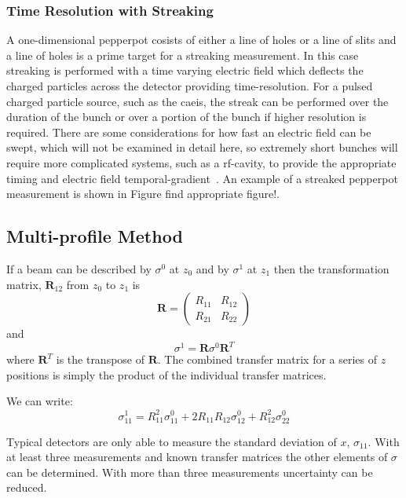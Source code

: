 \subsubsection{Time Resolution with Streaking}
A one-dimensional pepperpot cosists of either a line of holes or a line of slits and a line of holes is a prime target for a streaking measurement.
In this case streaking is performed with a time varying electric field which deflects the charged particles across the detector providing time-resolution.
For a pulsed charged particle source, such as the \gls{caeis}, the streak can be performed over the duration of the bunch or over a portion of the bunch if higher resolution is required.
There are some considerations for how fast an electric field can be swept, which will not be examined in detail here, so extremely short bunches will require more complicated systems, such as a rf-cavity, to provide the appropriate timing and electric field temporal-gradient~\cite{alesini_rf_2006}.
An example of a streaked pepperpot measurement is shown in Figure {\color{red}find appropriate figure!}.

\subsection{Multi-profile Method}

If a beam can be described by $\sigma^0$ at $z_0$ and by $\sigma^1$ at $z_1$ then the transformation matrix, $\mathbf{R}_{12}$ from $z_0$ to $z_1$ is
\begin{equation}
\mathbf{R} = \begin{pmatrix} R_{11} & R_{12} \\ R_{21} & R_{22} \end{pmatrix}
\end{equation}
and
\begin{equation}
\sigma^1 = \mathbf{R}\sigma^0\mathbf{R}^T
\end{equation}
where $\mathbf{R}^T$ is the transpose of $\mathbf{R}$.
The combined transfer matrix for a series of $z$ positions is simply the product of the individual transfer matrices.

We can write:
\begin{equation}\label{equation:multiprofile}
\sigma_{11}^1 = R_{11}^2\sigma_{11}^0 + 2R_{11}R_{12}\sigma_{12}^0 + R_{12}^2\sigma_{22}^0
\end{equation}

Typical detectors are only able to measure the standard deviation of $x$, $\sigma_{11}$.
With at least three measurements and known transfer matrices the other elements of $\sigma$ can be determined.
With more than three measurements uncertainty can be reduced.

